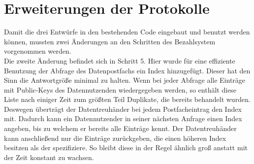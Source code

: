 \documentclass{scrreprt}
\begin{document}
\section{Erweiterungen der Protokolle}
Damit die drei Entwürfe in den bestehenden Code eingebaut und benutzt werden können, mussten zwei Änderungen an den Schritten des Bezahlsystem vorgenommen werden. 
\\

Die zweite Änderung befindet sich in Schritt 5. Hier wurde für eine effiziente Benutzung der Abfrage des Datenpostfachs ein Index hinzugefügt. Dieser hat den Sinn die Antwortgröße minimal zu halten. Wenn bei jeder Abfrage alle Einträge mit Public-Keys des Datennutzenden wiedergegeben werden, so enthält diese Liste nach einiger Zeit zum größten Teil Duplikate, die bereits behandelt wurden. Deswegen überträgt der Datentreuhänder bei jedem Postfacheintrag den Index mit. Dadurch kann ein Datennutzender in seiner nächsten Anfrage einen Index angeben, bis zu welchem er bereits alle Einträge kennt. Der Datentreuhänder kann anschließend nur die Einträge zurückgeben, die einen höheren Index besitzen als der spezifiziere. So bleibt diese in der Regel ähnlich groß anstatt mit der Zeit konstant zu wachsen.
\end{document}

